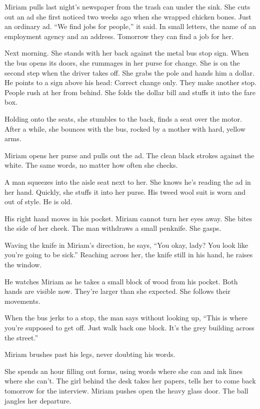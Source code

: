 \documentclass[
]{article}
\begin{document}
Miriam pulls last night's newspaper from the trash can under the sink.
She cuts out an ad she first noticed two weeks ago when she wrapped
chicken bones. Just an ordinary ad. ``We find jobs for people,'' it
said. In small letters, the name of an employment agency and an address.
Tomorrow they can find a job for her.

Next morning. She stands with her back against the metal bus stop sign.
When the bus opens its doors, she rummages in her purse for change. She
is on the second step when the driver takes off. She grabs the pole and
hands him a dollar. He points to a sign above his head: Correct change
only. They make another stop. People rush at her from behind. She folds
the dollar bill and stuffs it into the fare box.

Holding onto the seats, she stumbles to the back, finds a seat over the
motor. After a while, she bounces with the bus, rocked by a mother with
hard, yellow arms.

Miriam opens her purse and pulls out the ad. The clean black strokes
against the white. The same words, no matter how often she checks.

A man squeezes into the aisle seat next to her. She knows he's reading
the ad in her hand. Quickly, she stuffs it into her purse. His tweed
wool suit is worn and out of style. He is old.

His right hand moves in his pocket. Miriam cannot turn her eyes away.
She bites the side of her cheek. The man withdraws a small penknife. She
gasps.

Waving the knife in Miriam's direction, he says, ``You okay, lady? You
look like you're going to be sick.'' Reaching across her, the knife
still in his hand, he raises the window.

He watches Miriam as he takes a small block of wood from his pocket.
Both hands are visible now. They're larger than she expected. She
follows their movements.

When the bus jerks to a stop, the man says without looking up, ``This is
where you're sup­posed to get off. Just walk back one block. It's the
grey building across the street.''

Miriam brushes past his legs, never doubting his words.

She spends an hour filling out forms, using words where she can and ink
lines where she can't. The girl behind the desk takes her papers, tells
her to come back tomorrow for the interview. Miriam pushes open the
heavy glass door. The ball jangles her departure.
\end{document}
